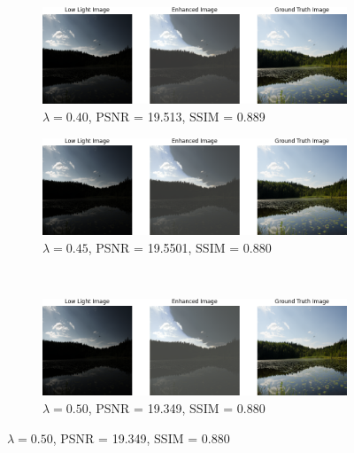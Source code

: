 \documentclass[a4paper]{ctexart}
\begin{document}
		
		\begin{figure}[htbp]
			\centering
			\begin{subfigure}{0.45\textwidth}
				\includegraphics[width=\linewidth]{picture/LLIE/Experiment/myplot_skip_stem_lambda_0.40_fpn_ssim_0.8894_psnr_19.5127}
				\caption{$\lambda = 0.40$, PSNR = 19.513, SSIM = 0.889}
				\label{fig: fpn_lambda = 0.40}	
			\end{subfigure}
			\begin{subfigure}{0.45\textwidth}
				\includegraphics[width=\linewidth]{picture/LLIE/Experiment/myplot_skip_stem_lambda_0.45_fpn_ssim_0.8803_psnr_19.5501}
				\caption{$\lambda = 0.45$, PSNR = 19.5501, SSIM = 0.880}
				\label{fig: fpn_lambda = 0.45}	
			\end{subfigure}\\
			\begin{subfigure}{0.45\textwidth}
				\includegraphics[width=\linewidth]{picture/LLIE/Experiment/myplot_skip_stem_lambda_0.50_fpn_ssim_0.8801_psnr_19.3493}
				\caption{$\lambda = 0.50$, PSNR = 19.349, SSIM = 0.880}
				\label{fig: fpn_lambda = 0.50}	
			\end{subfigure}

\end{figure}
\end{document}
